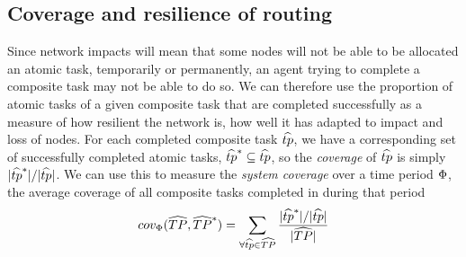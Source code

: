 \subsection{Coverage and resilience of routing}
\newcommand{\functionSystemCoverage}[2]{
	\functionSignature{cov_{\setTime{}{}}}{\setCompositeTask{}{}, \setCompositeTask{}{*}}
}
Since network impacts will mean that some nodes will not be able to be allocated an atomic task, temporarily or permanently, an agent trying to complete a composite task may not be able to do so. We can therefore use the proportion of atomic tasks of a given composite task that are completed successfully as a measure of how resilient the network is, how well it has adapted to impact and loss of nodes. For each completed composite task $\varCompositeTask{}{}$, we have a corresponding set of successfully completed atomic tasks, $\varCompositeTask{}{*} \subseteq \varCompositeTask{}{}$, so the \textit{coverage} of $\varCompositeTask{}{}$ is simply  $\funcSize{\varCompositeTask{}{*}}/\funcSize{\varCompositeTask{}{}}$. We can use this to measure the \textit{system coverage} over a time period $\Phi$, the average coverage of all composite tasks completed in during that period
\begin{equation}
	\functionSystemCoverage{}{} = \sum\limits_{\forall \varCompositeTask{}{} \in \setCompositeTask{}{}} \frac{ \funcSize{\varCompositeTask{}{*}}/\funcSize{\varCompositeTask{}{}}}{\funcSize{\setCompositeTask{}{}}{}}
\end{equation}

